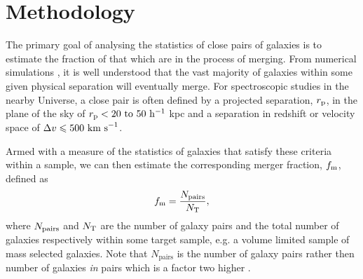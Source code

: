%
%
%

\section{Methodology}\label{merger-sec:method}
The primary goal of analysing the statistics of close pairs of galaxies is to estimate the fraction of that which are in the process of merging. From numerical simulations \citep{Kitzbichler:2008gi}, it is well understood that the vast majority of galaxies within some given physical separation will eventually merge. For spectroscopic studies in the nearby Universe, a close pair is often defined by a projected separation, \(r_{\textup{p}} \), in the plane of the sky of \(r_{\textup{p}} < 20~\rm{to}~50~ h^{-1}\) kpc and a separation in redshift or velocity space of \( \Delta v \leq 500 \textup{ km s}^{-1}\).

Armed with a measure of the statistics of galaxies that satisfy these criteria within a sample, we can then estimate the corresponding merger fraction, $f_{\textup{m}}$, defined as
\begin{equation}
	f_{\textup{m}} = \frac{N_{\textup{pairs}}} {N_{\textup{T}}},
\end{equation}
where \(N_{\textup{pairs}}\) and \(N_{\textup{T}}\) are the number of galaxy pairs and the total number of galaxies respectively within some target sample, e.g. a volume limited sample of mass selected galaxies. Note that $N_{\text{pairs}}$ is the number of galaxy pairs rather then number of galaxies \emph{in} pairs which is a factor two higher \citep{Patton:2000kt}.

